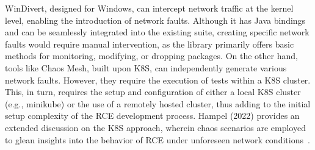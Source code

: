 WinDivert, designed for Windows, can intercept network traffic at the kernel level, enabling the introduction of network faults. Although it has Java bindings and can be seamlessly integrated into the existing suite, creating specific network faults would require manual intervention, as the library primarily offers basic methods for monitoring, modifying, or dropping packages. On the other hand, tools like Chaos Mesh, built upon \ac{K8S}, can independently generate various network faults. However, they require the execution of tests within a \ac{K8S} cluster. This, in turn, requires the setup and configuration of either a local \ac{K8S} cluster (e.g., minikube) or the use of a remotely hosted cluster, thus adding to the initial setup complexity of the \ac{RCE} development process. Hampel (2022) provides an extended discussion on the \ac{K8S} approach, wherein chaos scenarios are employed to glean insights into the behavior of \ac{RCE} under unforeseen network conditions~\cite{Hampel2022}.